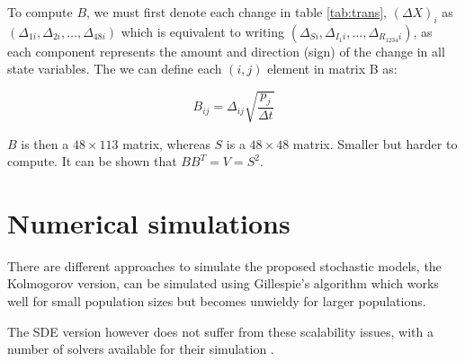\documentclass[12pt]{article}
\begin{document}
To compute $B$, we must first denote each change in table \ref{tab:trans}, 
$(\Delta X)_i$ as $(\Delta_{1i}, \Delta_{2i}, \ldots, \Delta_{48i})$ which is 
equivalent to writing $(\Delta_{Si}, \Delta_{I_1i}, \ldots, 
\Delta_{R_{1234}i})$, as each component represents the amount and direction 
(sign)  of the change in all state variables. The we can define each $(i,j)$ 
element in matrix B as:

\begin{equation}
 B_{ij} = \Delta_{ij}\sqrt{\frac{p_j}{\Delta t}}
\end{equation}

$B$ is then a $48 \times 113$ matrix, whereas $S$ is a $48 \times 48$ matrix. 
Smaller but harder to compute. It can be shown that $B B^T = V = S^2$.

\section*{Numerical simulations}

There are different approaches to simulate the proposed stochastic  models, the 
Kolmogorov version, can be simulated using Gillespie's algorithm which works 
well for small population sizes but becomes unwieldy for larger populations. 

The SDE version however does not suffer from these scalability issues, with a 
number of solvers available for their simulation 
\citep{higham_algorithmic_2001}.


\end{document}
